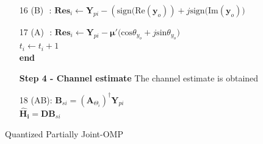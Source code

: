 {\begin{center}
{\begin{minipage}{1.2\linewidth}
\begin{algorithm}[H]
\begin{enumerate}
     \hspace*{\algorithmicindent}
  \item[16  (B)\,\, :] $\mathbf{Res}_i \leftarrow \mathbf{Y}_{pi}-(\text{sign(Re}(\mathbf{y}_o))+j\text{sign(Im}(\mathbf{y}_o))$
 \item[17  (A)\,\, :]   $ \mathbf{Res}_i \leftarrow \mathbf{Y}_{pi}-\mathbf{\mu'} \Big( \text{cos}\theta_{y_o} + j\text{sin}\theta_{y_o} \Big)$\\
  \hspace*{\algorithmicindent}
   $ t_i \leftarrow t_i+1 $\\
   \textbf{end}\\
   \rule{0pt}{4ex}
\textbf{Step 4 - Channel estimate}
The channel estimate is obtained 
\item[18 (AB):]$\mathbf{B}_{si}=(\mathbf{A}_{\Theta_i})^{\dagger}\mathbf{Y}_{pi}$\\
$\mathbf{\hat{H}_i}=\mathbf{D B}_{si}$
\hspace*{\algorithmicindent} 
\end{enumerate}
 \caption{ Quantized Partially Joint-OMP}
 \label{algo2}
\end{algorithm}
\end{minipage}}\end{center}
}

